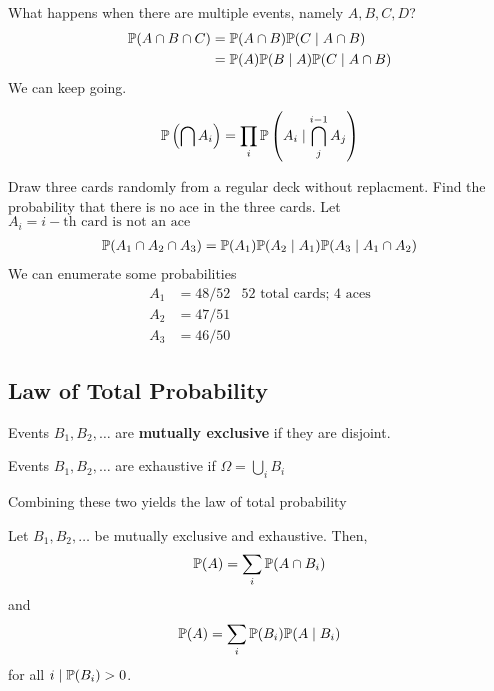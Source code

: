 What happens when there are multiple events, namely $A, B, C, D$?
\begin{align}
    \mathbb{P}(A \cap B \cap C) &= \mathbb{P}(A \cap B) \mathbb{P}(C \mid A\cap B)\\
    &= \mathbb{P}(A)\mathbb{P}(B \mid A) \mathbb{P}(C \mid A\cap B)
\end{align}
We can keep going.
\begin{proposition}
    \begin{align}
        \mathbb{P}\left(\bigcap A_i\right) = \prod_i \mathbb{P}\left(A_i \mid \bigcap_j^{i-1} A_j\right)
    \end{align}
\end{proposition}
\begin{example}
    Draw three cards randomly from a regular deck without replacment. Find the probability that there is no ace in the three cards. Let $A_i = i-\text{th card is not an ace}$
    \begin{align}
        \mathbb{P}(A_1 \cap A_2 \cap A_3) = \mathbb{P}(A_1) \mathbb{P}(A_2 \mid A_1) \mathbb{P}(A_3\mid A_1 \cap A_2)
    \end{align}
    We can enumerate some probabilities
    \begin{align}
        A_1 &= 48/52 & \text{52 total cards; 4 aces}\\
        A_2 &= 47/51\\
        A_3 &= 46/50
    \end{align}
\end{example}

\subsection{Law of Total Probability}
\begin{definition}
    Events $B_1, B_2, \ldots$ are \textbf{mutually exclusive} if they are disjoint.
\end{definition}
\begin{definition}
    Events $B_1, B_2, \ldots$ are exhaustive if $\Omega = \bigcup_i B_i$
\end{definition}
Combining these two yields the law of total probability
\begin{theorem}
    Let $B_1, B_2, \ldots$ be mutually exclusive and exhaustive. Then,
    \begin{align}
        \mathbb{P}(A) = \sum_i \mathbb{P}(A \cap B_i)
    \end{align}
    and
    \begin{align}
        \mathbb{P}(A) = \sum_i \mathbb{P}(B_i) \mathbb{P}(A \mid B_i)
    \end{align}
    for all $i \mid \mathbb{P}(B_i) > 0$.
\end{theorem}
